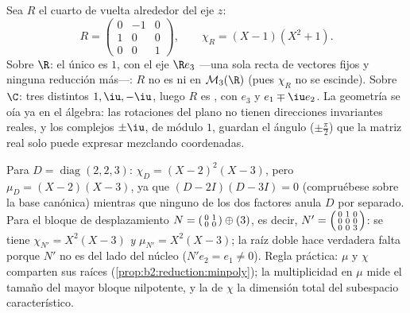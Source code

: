 \begin{example}\label{ex:b2:reduction:rotation3d}
Sea $R$ el cuarto de vuelta alrededor del eje $z$:
\[
R = \begin{pmatrix}
0 & -1 & 0\\
1 & 0 & 0\\
0 & 0 & 1
\end{pmatrix},
\qquad
\chi_R = (X - 1)(X^2 + 1).
\]
Sobre $\R$: el único  es $1$, con  el
eje $\R e_3$ ---una sola recta de vectores fijos y ninguna reducción
más---: $R$ no es  ni  en
$\mathcal{M}_3(\R)$ (pues $\chi_R$ no se escinde). Sobre $\C$: tres
 distintos $1, \iu, -\iu$, luego $R$ es
, con  $e_3$ y $e_1 \mp \iu e_2$.
La geometría se oía ya en el álgebra: las rotaciones del plano no
tienen direcciones invariantes reales, y los 
complejos $\pm\iu$, de módulo $1$, guardan el ángulo
($\pm\frac\pi2$) que la matriz real solo puede expresar mezclando
coordenadas.
\end{example}

\begin{example}\label{ex:b2:reduction:minvschar}
Para $D = \operatorname{diag}(2, 2, 3)$: $\chi_D = (X - 2)^2(X -
3)$, pero $\mu_D = (X - 2)(X - 3)$, ya que $(D - 2I)(D - 3I) = 0$
(compruébese sobre la base canónica) mientras que ninguno de los dos
factores anula $D$ por separado. Para el bloque de desplazamiento $N
= \begin{psmallmatrix}0 & 1\\ 0 & 0\end{psmallmatrix} \oplus (3)$,
es decir, $N' = \begin{psmallmatrix}0 & 1 & 0\\ 0 & 0 & 0\\ 0 & 0 &
3\end{psmallmatrix}$: se tiene $\chi_{N'} = X^2(X - 3)$ \emph{y}
$\mu_{N'} = X^2(X - 3)$; la raíz doble hace verdadera falta porque
$N'$ no es  del lado del núcleo ($N'e_2 = e_1 \neq
0$). Regla práctica: $\mu$ y $\chi$ comparten sus raíces
(\cref{prop:b2:reduction:minpoly}); la multiplicidad en $\mu$ mide
el tamaño del mayor bloque nilpotente, y la de $\chi$ la dimensión
total del subespacio característico.
\end{example}

